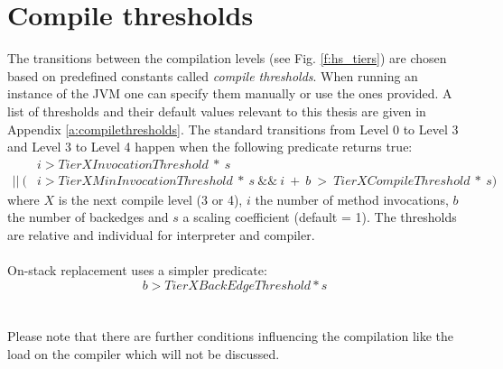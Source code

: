 \section{Compile thresholds}
\label{s:compilethresholds}
The transitions between the compilation levels (see Fig. \ref{f:hs_tiers}) are chosen based on predefined constants called \textit{compile thresholds}. When running an instance of the JVM one can specify them manually or use the ones provided. A list of thresholds and their default values relevant to this thesis are given in Appendix \ref{a:compilethresholds}.
The standard transitions from Level 0 to Level 3 and Level 3 to Level 4 happen when the following predicate returns true:
\begin{align*}
& i > TierXInvocationThreshold \ * \ s \\
 || \ (&i > TierXMinInvocationThreshold \ * \ s \ \&\& \ i \ + \ b \ > \ TierXCompileThreshold \ * \ s) 
\end{align*}
where $X$ is the next compile level (3 or 4), $i$ the number of method invocations, $b$ the number of backedges and $s$ a scaling coefficient (default = 1).
The thresholds are relative and individual for interpreter and compiler.
\\\\
On-stack replacement uses a simpler predicate:
$$b > TierXBackEdgeThreshold * s$$
\\\\
Please note that there are further conditions influencing the compilation like the load on the compiler which will not be discussed.
